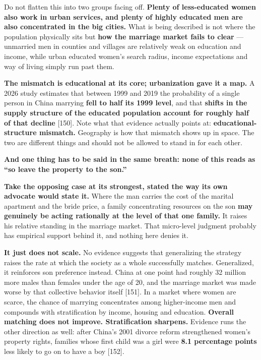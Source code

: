 \documentclass[11pt,a4paper]{article}
\begin{document}
Do not flatten this into two groups facing off. \textbf{Plenty of less-educated women also work in urban services, and plenty of highly educated men are also concentrated in the big cities.} What is being described is not where the population physically sits but \textbf{how the marriage market fails to clear} --- unmarried men in counties and villages are relatively weak on education and income, while urban educated women's search radius, income expectations and way of living simply run past them.

\textbf{The mismatch is educational at its core; urbanization gave it a map.} A 2026 study estimates that between 1999 and 2019 the probability of a single person in China marrying \textbf{fell to half its 1999 level}, and that \textbf{shifts in the supply structure of the educated population account for roughly half of that decline}{} [150]. Note what that evidence actually points at: \textbf{educational-structure mismatch.} Geography is how that mismatch shows up in space. The two are different things and should not be allowed to stand in for each other.

\textbf{And one thing has to be said in the same breath: none of this reads as ``so leave the property to the son.''}

\textbf{Take the opposing case at its strongest, stated the way its own advocate would state it.} Where the man carries the cost of the marital apartment and the bride price, a family concentrating resources on the son \textbf{may genuinely be acting rationally at the level of that one family.} It raises his relative standing in the marriage market. That micro-level judgment probably has empirical support behind it, and nothing here denies it.

\textbf{It just does not scale.} No evidence suggests that generalizing the strategy raises the rate at which the society as a whole successfully matches. Generalized, it reinforces son preference instead. China at one point had roughly 32 million more males than females under the age of 20, and the marriage market was made worse by that collective behavior itself [151]. In a market where women are scarce, the chance of marrying concentrates among higher-income men and compounds with stratification by income, housing and education. \textbf{Overall matching does not improve. Stratification sharpens.} Evidence runs the other direction as well: after China's 2001 divorce reform strengthened women's property rights, families whose first child was a girl were \textbf{8.1 percentage points} less likely to go on to have a boy [152].
\end{document}
